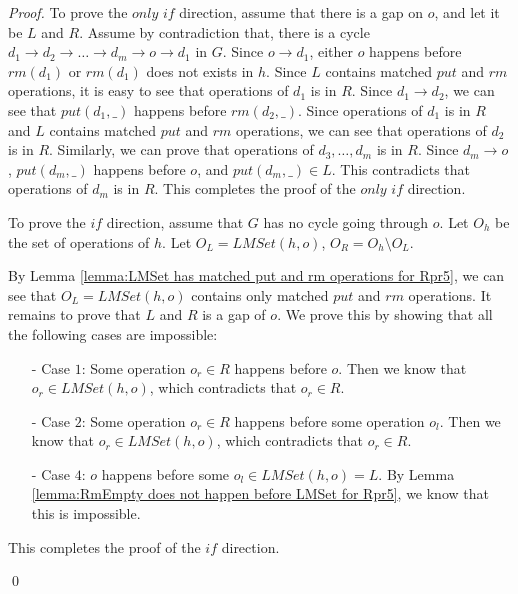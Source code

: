 \begin {proof}

To prove the $\textit{only if}$ direction, assume that there is a gap on $o$, and let it be $L$ and $R$. Assume by contradiction that, there is a cycle $d_1 \rightarrow d_2 \rightarrow \ldots \rightarrow d_m \rightarrow o \rightarrow d_1$ in $G$. Since $o \rightarrow d_1$, either $o$ happens before $\textit{rm}(d_1)$ or $\textit{rm}(d_1)$ does not exists in $h$. Since $L$ contains matched $\textit{put}$ and $\textit{rm}$ operations, it is easy to see that operations of $d_1$ is in $R$. Since $d_1 \rightarrow d_2$, we can see that $\textit{put}(d_1,\_)$ happens before $\textit{rm}(d_2,\_)$. Since operations of $d_1$ is in $R$ and $L$ contains matched $\textit{put}$ and $\textit{rm}$ operations, we can see that operations of $d_2$ is in $R$. Similarly, we can prove that operations of $d_3,\ldots,d_m$ is in $R$. Since $d_m \rightarrow o$, $\textit{put}(d_m,\_)$ happens before $o$, and $\textit{put}(d_m,\_) \in L$. This contradicts that operations of $d_m$ is in $R$. This completes the proof of the $\textit{only if}$ direction.

To prove the $\textit{if}$ direction, assume that $G$ has no cycle going through $o$. Let $O_h$ be the set of operations of $h$. Let $O_L = \textit{LMSet}(h,o)$, $O_R = O_h \setminus O_L$.

By Lemma \ref{lemma:LMSet has matched put and rm operations for Rpr5}, we can see that $O_L = \textit{LMSet}(h,o)$ contains only matched $\textit{put}$ and $\textit{rm}$ operations. It remains to prove that $L$ and $R$ is a gap of $o$. We prove this by showing that all the following cases are impossible:

\begin{itemize}
\setlength{\itemsep}{0.5pt}
\item[-] Case $1$: Some operation $o_r \in R$ happens before $o$. Then we know that $o_r \in \textit{LMSet}(h,o)$, which contradicts that $o_r \in R$.

\item[-] Case $2$: Some operation $o_r \in R$ happens before some operation $o_l$. Then we know that $o_r \in \textit{LMSet}(h,o)$, which contradicts that $o_r \in R$.

\item[-] Case $4$: $o$ happens before some $o_l \in \textit{LMSet}(h,o) = L$. By Lemma \ref{lemma:RmEmpty does not happen before LMSet for Rpr5}, we know that this is impossible.
\end{itemize}

This completes the proof of the $\textit{if}$ direction.

\qed
\end {proof}

